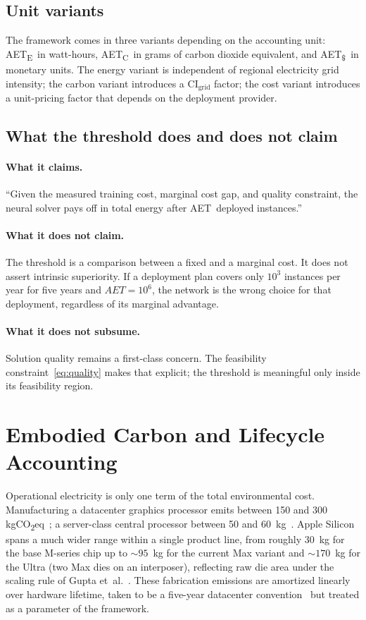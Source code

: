 \documentclass[11pt]{article}
\newcommand{\AET}{AET}
\newcommand{\AETE}{AET\textsubscript{E}}
\newcommand{\AETC}{AET\textsubscript{C}}
\newcommand{\AETD}{AET\textsubscript{\$}}
\begin{document}
\subsection{Unit variants}

The framework comes in three variants depending on the accounting unit: \AETE\ in watt-hours, \AETC\ in grams of carbon dioxide equivalent, and \AETD\ in monetary units. The energy variant is independent of regional electricity grid intensity; the carbon variant introduces a \(\mathrm{CI}_\text{grid}\) factor; the cost variant introduces a unit-pricing factor that depends on the deployment provider.

\subsection{What the threshold does and does not claim}

\paragraph{What it claims.} ``Given the measured training cost, marginal
cost gap, and quality constraint, the neural solver pays off in total energy after \AET\ deployed instances.''

\paragraph{What it does not claim.} The threshold is a comparison between
a fixed and a marginal cost. It does not assert intrinsic superiority. If a deployment plan covers only \(10^3\) instances per year for five years and \(\AET = 10^6\), the network is the wrong choice for that deployment, regardless of its marginal advantage.

\paragraph{What it does not subsume.} Solution quality remains a
first-class concern. The feasibility constraint~\eqref{eq:quality} makes that explicit; the threshold is meaningful only inside its feasibility region.

\section{Embodied Carbon and Lifecycle Accounting}
\label{sec:embodied}

Operational electricity is only one term of the total environmental cost. Manufacturing a datacenter graphics processor emits between 150 and 300 kgCO\textsubscript{2}eq~\cite{luccioni2023bloom,gupta2021chasing}; a server-class central processor between 50 and 60~kg~\cite{gupta2021chasing}. Apple Silicon spans a much wider range within a single product line, from roughly 30~kg for the base M-series chip up to \(\sim\!95\)~kg for the current Max variant and \(\sim\!170\)~kg for the Ultra (two Max dies on an interposer), reflecting raw die area under the scaling rule of Gupta et~al.~\cite{gupta2021chasing}. These fabrication emissions are amortized linearly over hardware lifetime, taken to be a five-year datacenter convention~\cite{shehabi2016datacenter} but treated as a parameter of the framework.
\end{document}
